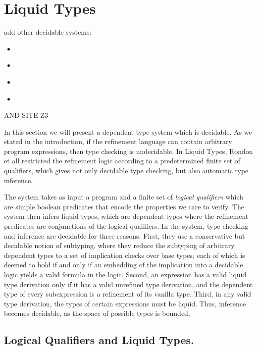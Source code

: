 	\newcommand\qset{\ensuremath{\mathbb{Q}}}
\newcommand\NV[1]{\columnbreak}

\section{Liquid Types}\label{sec:liquid}


{\color{green}
add other decidable systems:
\begin{itemize}
\item \cite{pfenningxi98, XiPfenning99, Xi00, FreemanPfenning91, MandelbaumWalker03, Ou2004}
\item \cite{dminor, SwamyCFSBY11}
\item \cite{SuterKK11}
\item \cite{UnnoTK13, VytiniotisJCR13} 
\end{itemize}

AND SITE Z3 \cite{z3}
}

In this section we will present a dependent type system which is decidable.
As we stated in the introduction, if the refinement language can contain arbitrary 
program expressions, then type checking is undecidable.
%
In Liquid Types\cite{LiquidPLDI08},  Rondon et all restricted the refinement logic according to a predetermined 
finite set of qualifiers,  which gives not only decidable type checking, but also automatic
type inference.



The system takes as input a program and 
a finite set of \textit{logical qualifiers}
which are simple boolean predicates 
that encode the properties we care to verify. 
The system then infers
liquid types, which are dependent types where the refinement predicates are conjunctions of the logical qualifiers.
In the system, type checking and inference are decidable for
three reasons. 
%
First, they use a conservative but decidable
notion of subtyping, where they reduce the subtyping of arbitrary
dependent types to a set of implication checks over base types,
each of which is deemed to hold if and only if an embedding of
the implication into a decidable logic yields a valid formula in
the logic. 
%
Second, an expression has a valid liquid type derivation
only if it has a valid unrefined type derivation, and the dependent 
type of every subexpression is a refinement of its vanilla type. 
%
Third, in any valid type derivation, the types of certain expressions
must be liquid. Thus, inference becomes decidable, as the space of
possible types is bounded. 


\subsection{Logical Qualifiers and Liquid Types.}

